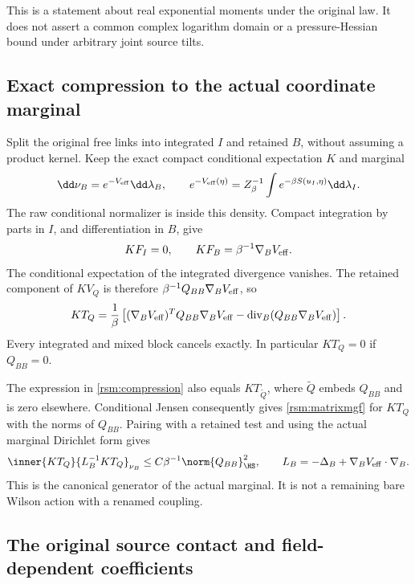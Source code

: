 This is a statement about real exponential moments under the original law. It does not assert a common complex logarithm domain or a pressure-Hessian bound under arbitrary joint source tilts.

\subsection{Exact compression to the actual coordinate marginal}

Split the original free links into integrated \(I\) and retained \(B\), without assuming a product kernel. Keep the exact compact conditional expectation \(K\) and marginal
\[
 \dd\nu_B=e^{-V_{\rm eff}}\dd\lambda_B,\qquad
 e^{-V_{\rm eff}(\eta)}
 =Z_\beta^{-1}\int e^{-\beta S(u_I,\eta)}\dd\lambda_I.
\]
The raw conditional normalizer is inside this density. Compact integration by parts in \(I\), and differentiation in \(B\), give
\[
 KF_I=0,\qquad KF_B=\beta^{-1}\nabla_BV_{\rm eff}.
\]
The conditional expectation of the integrated divergence vanishes. The retained component of \(KV_Q\) is therefore
\(\beta^{-1}Q_{BB}\nabla_BV_{\rm eff}\), so
\begin{equation}
 KT_Q
 =\frac1\beta\left[
   (\nabla_BV_{\rm eff})^TQ_{BB}\nabla_BV_{\rm eff}
   -\operatorname{div}_B(Q_{BB}\nabla_BV_{\rm eff})
 \right].
 \label{rsm:compression}
\end{equation}
Every integrated and mixed block cancels exactly. In particular \(KT_Q=0\) if \(Q_{BB}=0\).

The expression in \eqref{rsm:compression} also equals \(KT_{\widetilde Q}\), where \(\widetilde Q\) embeds \(Q_{BB}\) and is zero elsewhere. Conditional Jensen consequently gives \eqref{rsm:matrixmgf} for \(KT_Q\) with the norms of \(Q_{BB}\). Pairing with a retained test and using the actual marginal Dirichlet form gives
\begin{equation}
 \inner{KT_Q}{L_B^{-1}KT_Q}_{\nu_B}
 \le C\beta^{-1}\norm{Q_{BB}}_{\HS}^2,\qquad
 L_B=-\Delta_B+\nabla_BV_{\rm eff}\cdot\nabla_B.
 \label{rsm:compressedinverse}
\end{equation}
This is the canonical generator of the actual marginal. It is not a remaining bare Wilson action with a renamed coupling.

\subsection{The original source contact and field-dependent coefficients}

